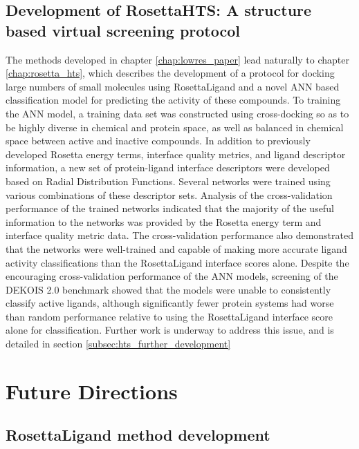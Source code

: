 \subsection{Development of RosettaHTS: A structure based virtual screening protocol}
The methods developed in chapter \ref{chap:lowres_paper} lead naturally to chapter \ref{chap:rosetta_hts}, which describes the development of a protocol for docking large numbers of small molecules using RosettaLigand and a novel ANN based classification model for predicting the activity of these compounds.
To training the ANN model, a training data set was constructed using cross-docking so as to be highly diverse in chemical and protein space, as well as balanced in chemical space between active and inactive compounds.
In addition to previously developed Rosetta energy terms, interface quality metrics, and ligand descriptor information, a new set of protein-ligand interface descriptors were developed based on Radial Distribution Functions.
Several networks were trained using various combinations of these descriptor sets.
Analysis of the cross-validation performance of the trained networks indicated that the majority of the useful information to the networks was provided by the Rosetta energy term and interface quality metric data.
The cross-validation performance also demonstrated that the networks were well-trained and capable of making more accurate ligand activity classifications than the RosettaLigand interface scores alone. 
Despite the encouraging cross-validation performance of the ANN models, screening of the DEKOIS 2.0 benchmark showed that the models were unable to consistently classify active ligands, although significantly fewer protein systems had worse than random performance relative to using the RosettaLigand interface score alone for classification.
Further work is underway to address this issue, and is detailed in section \ref{subsec:hts_further_development}

\section{Future Directions}

\subsection{RosettaLigand method development}

